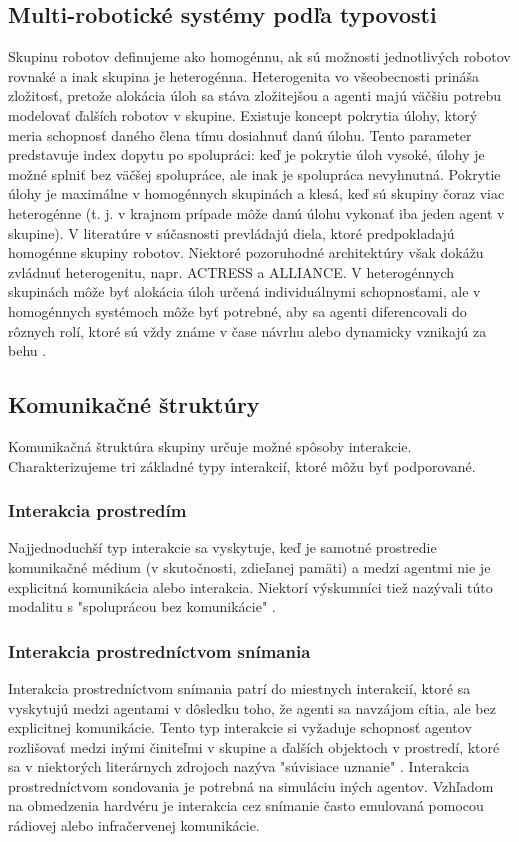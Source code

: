 \subsection{Multi-robotické systémy podľa typovosti}
Skupinu robotov definujeme ako homogénnu, ak sú možnosti jednotlivých robotov rovnaké a inak skupina je heterogénna. Heterogenita
vo všeobecnosti prináša zložitosť, pretože alokácia úloh sa stáva zložitejšou a agenti majú väčšiu potrebu modelovať
ďalších robotov v skupine. Existuje koncept pokrytia úlohy, ktorý meria schopnosť daného člena tímu dosiahnuť danú
úlohu. Tento parameter predstavuje index dopytu po spolupráci: keď je pokrytie úloh vysoké, úlohy je možné splniť bez
väčšej spolupráce, ale inak je spolupráca nevyhnutná. Pokrytie úlohy je maximálne v homogénnych skupinách a klesá, keď
sú skupiny čoraz viac heterogénne (t. j. v krajnom prípade môže danú úlohu vykonať iba jeden agent v skupine).
V literatúre v súčasnosti prevládajú diela, ktoré predpokladajú homogénne skupiny robotov. Niektoré pozoruhodné
architektúry však dokážu zvládnuť heterogenitu, napr. ACTRESS a ALLIANCE. V heterogénnych
skupinách môže byť alokácia úloh určená individuálnymi schopnosťami, ale v homogénnych systémoch môže byť potrebné, aby
sa agenti diferencovali do rôznych rolí, ktoré sú vždy známe v čase návrhu alebo dynamicky vznikajú za behu \citep{vascak}.

\subsection{Komunikačné štruktúry}
Komunikačná štruktúra skupiny určuje možné spôsoby interakcie. Charakterizujeme tri základné typy interakcií, ktoré môžu
byť podporované.

\subsubsection{Interakcia prostredím}
Najjednoduchší typ interakcie sa vyskytuje, keď je samotné prostredie komunikačné médium (v skutočnosti,
zdieľanej pamäti) a medzi agentmi nie je explicitná komunikácia alebo interakcia. Niektorí výskumníci tiež nazývali túto
modalitu s "spoluprácou bez komunikácie" \citep{arkin}.

\subsubsection{Interakcia prostredníctvom snímania}
Interakcia prostredníctvom snímania patrí do miestnych interakcií, ktoré sa vyskytujú medzi agentami v dôsledku toho, že agenti sa navzájom cítia, ale bez
explicitnej komunikácie. Tento typ interakcie si vyžaduje schopnosť agentov rozlišovať medzi inými činiteľmi v skupine a
ďalších objektoch v prostredí, ktoré sa v niektorých literárnych zdrojoch nazýva "súvisiace uznanie" \citep{mataric}.
Interakcia prostredníctvom sondovania je potrebná na simuláciu iných agentov. Vzhľadom na obmedzenia hardvéru je
interakcia cez snímanie často emulovaná pomocou rádiovej alebo infračervenej komunikácie.

